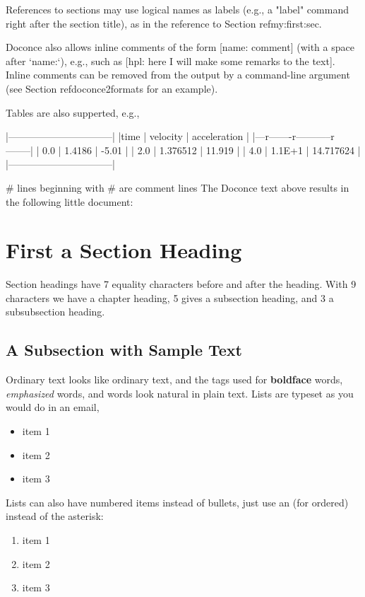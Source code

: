 \documentclass[%
oneside,                 %
final,                   %
10pt]{article}
\begin{document}
References to sections may use logical names as labels (e.g., a
"label" command right after the section title), as in the reference to
Section ref{my:first:sec}.

Doconce also allows inline comments of the form [name: comment] (with
a space after `name:`), e.g., such as [hpl: here I will make some
remarks to the text]. Inline comments can be removed from the output
by a command-line argument (see Section ref{doconce2formats} for an
example).

Tables are also supperted, e.g.,

  |--------------------------------|
  |time  | velocity | acceleration |
  |---r-------r-----------r--------|
  | 0.0  | 1.4186   | -5.01        |
  | 2.0  | 1.376512 | 11.919       |
  | 4.0  | 1.1E+1   | 14.717624    |
  |--------------------------------|

# lines beginning with # are comment lines
\eccq
The Doconce text above results in the following little document:


\section{First a Section Heading}

Section headings have 7 equality characters before and after the heading.
With 9 characters we have a chapter heading, 5 gives a subsection
heading, and 3 a subsubsection heading.

\subsection{A Subsection with Sample Text}
\label{my:first:sec}

Ordinary text looks like ordinary text, and the tags used for
\textbf{boldface} words, \emph{emphasized} words, and  words look
natural in plain text.  Lists are typeset as you would do in an email,

\begin{itemize}
  \item item 1

  \item item 2

  \item item 3
\end{itemize}

\noindent
Lists can also have numbered items instead of bullets, just use an 
(for ordered) instead of the asterisk:

\begin{enumerate}
 \item item 1

 \item item 2

 \item item 3
\end{enumerate}
\end{document}
